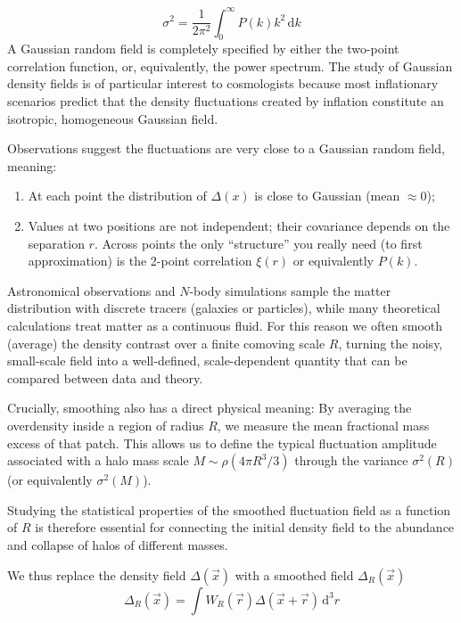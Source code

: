 \begin{equation*}
    \sigma^{2} = \frac{1}{2\pi^{2}}\int_{0}^{\infty}P(k)k^{2}\,\text{d}k
\end{equation*}
A Gaussian random field is completely specified by either the two-point correlation function, or, equivalently, the power spectrum. The study of Gaussian density fields is of particular interest to cosmologists because most inflationary scenarios predict that the density fluctuations created by inflation constitute an isotropic, homogeneous Gaussian field.
\par Observations suggest the fluctuations are very close to a Gaussian random field, meaning:
\begin{enumerate}
    \item At each point the distribution of $\Delta(x)$ is close to Gaussian (mean $\approx 0$);
    \item Values at two positions are not independent; their covariance depends on the separation $r$. Across points the only “structure” you really need (to first approximation) is the 2-point correlation $\xi(r)$ or equivalently $P(k)$.
\end{enumerate}
\par Astronomical observations and $N$-body simulations sample the matter distribution with discrete tracers (galaxies or particles), while many theoretical calculations treat matter as a continuous fluid. For this reason we often smooth (average) the density contrast over a finite comoving scale $R$, turning the noisy, small-scale field into a well-defined, scale-dependent quantity that can be compared between data and theory.
\par Crucially, smoothing also has a direct physical meaning: By averaging the overdensity inside a region of radius $R$, we measure the mean fractional mass excess of that patch. This allows us to define the typical fluctuation amplitude associated with a halo mass scale $M\sim \rho(4\pi R^{3}/3)$ through the variance $\sigma^{2}(R)$ (or equivalently $\sigma^{2}(M)$).
\par Studying the statistical properties of the smoothed fluctuation field as a function of $R$ is therefore essential for connecting the initial density field to the abundance and collapse of halos of different masses.
\par We thus replace the density field $\Delta(\vec{x})$ with a smoothed field $\Delta_{R}(\vec{x})$
\begin{equation*}
    \Delta_{R}(\vec{x}) = \int W_{R}(\vec{r})\Delta(\vec{x}+\vec{r})\,\text{d}^{3}r
\end{equation*}
